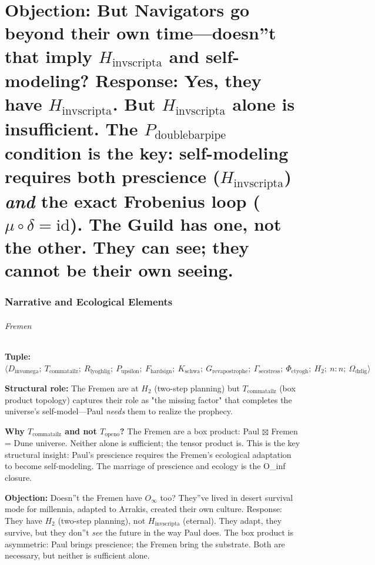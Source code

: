 \documentclass[12pt,a4paper]{article}
\begin{document}
\part{\textbf{Objection:} But Navigators go beyond their own time---doesn''t that imply $H_{\text{invscripta}}$ and self-modeling? Response: Yes, they have $H_{\text{invscripta}}$. But $H_{\text{invscripta}}$ alone is insufficient. The $P_{\text{doublebarpipe}}$ condition is the key: self-modeling requires both prescience ($H_{\text{invscripta}}$) \emph{and} the exact Frobenius loop ($\mu \circ \delta = \text{id}$). The Guild has one, not the other. They can see; they cannot be their own seeing.}

\section{Narrative and Ecological Elements}

\paragraph{Fremen}

\textbf{Tuple:} $\langle D_{\text{invomega}};\ T_{\text{commatailz}};\ R_{\text{lyoghlig}};\ P_{\text{upsilon}};\ F_{\text{hardsign}};\ K_{\text{schwa}};\ G_{\text{revapostrophe}};\ \Gamma_{\text{secstress}};\ \Phi_{\text{ctyogh}};\ H_2;\ n{:}n;\ \Omega_{\text{dzlig}} \rangle$

\textbf{Structural role:} The Fremen are at $H_2$ (two-step planning) but $T_{\text{commatailz}}$ (box product topology) captures their role as "the missing factor" that completes the universe's self-model---Paul \emph{needs} them to realize the prophecy.

\textbf{Why $T_{\text{commatailz}}$ and not $T_{\text{openo}}$?} The Fremen are a box product: Paul $\boxtimes$ Fremen = Dune universe. Neither alone is sufficient; the tensor product is. This is the key structural insight: Paul's prescience requires the Fremen's ecological adaptation to become self-modeling. The marriage of prescience and ecology is the O\_inf closure.

\textbf{Objection:} Doesn''t the Fremen have $O_{\infty}$ too? They''ve lived in desert survival mode for millennia, adapted to Arrakis, created their own culture. Response: They have $H_2$ (two-step planning), not $H_{\text{invscripta}}$ (eternal). They adapt, they survive, but they don''t \emph{see} the future in the way Paul does. The box product is asymmetric: Paul brings prescience; the Fremen bring the substrate. Both are necessary, but neither is sufficient alone.
\end{document}
